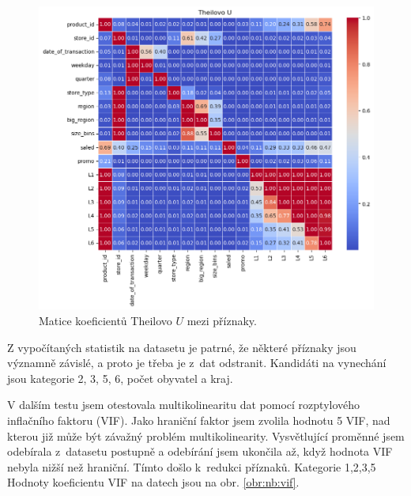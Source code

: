 \begin{figure}[h!]
    \centering
    \includegraphics[width=\textwidth]{obrazky/pripravadat/theils_u-002.png}
    \caption{Matice koeficientů Theilovo $U$ mezi příznaky.}
    \label{obr:nb:thiels}
\end{figure}

Z vypočítaných statistik na datasetu je patrné, že některé příznaky jsou významně závislé, a proto je třeba je z~dat odstranit. Kandidáti na vynechání jsou kategorie 2, 3, 5, 6, počet obyvatel a kraj. 

V dalším testu jsem otestovala multikolinearitu dat pomocí rozptylového inflačního faktoru (VIF). Jako hraniční faktor jsem zvolila hodnotu 5 VIF, nad kterou již může být závažný problém multikolinearity.\cite{bib:MB}
Vysvětlující proměnné jsem odebírala z~datasetu postupně a odebírání jsem ukončila až, když hodnota VIF nebyla nižší než hraniční.
Tímto došlo k~redukci příznaků. Kategorie 1,2,3,5 
Hodnoty koeficientu VIF na datech jsou na obr. \ref*{obr:nb:vif}. 

